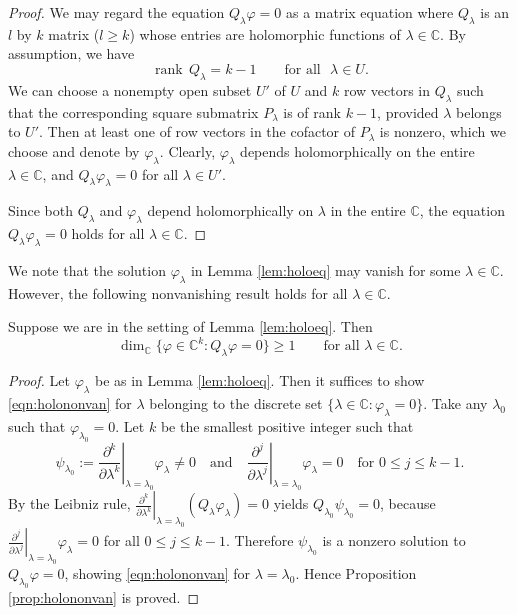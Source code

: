 \begin{proof}
We may regard the equation $Q_{\lambda} \varphi =0$
 as a matrix equation 
 where $Q_{\lambda}$ is an $l$ by $k$ matrix
 ($l \ge k$) 
 whose entries are holomorphic functions of $\lambda \in {\mathbb{C}}$.  
By assumption,
 we have
\[
 {\operatorname{rank}} \, Q_{\lambda}=k-1
\qquad
 \text{for all }\,\, \lambda \in U.  
\]
We can choose a nonempty open subset $U'$ of $U$
 and $k$ row vectors in $Q_{\lambda}$
 such that the corresponding square submatrix $P_{\lambda}$
 is of rank $k-1$, 
 provided $\lambda$ belongs to $U'$.  
Then at least one of row vectors
 in the cofactor of $P_{\lambda}$ is nonzero, 
 which we choose and denote by $\varphi_{\lambda}$.  
Clearly, 
 $\varphi_{\lambda}$ depends holomorphically
 on the entire ${\lambda}\in {\mathbb{C}}$, 
 and $Q_{\lambda} \varphi_{\lambda}=0$
 for all $\lambda \in U'$.  



Since both $Q_{\lambda}$ and $\varphi_{\lambda}$ depend holomorphically
 on $\lambda$
 in the entire ${\mathbb{C}}$, 
 the equation $Q_{\lambda}\varphi_{\lambda}=0$ holds
 for all $\lambda \in {\mathbb{C}}$.  
\end{proof}



We note that the solution $\varphi_{\lambda}$
 in Lemma \ref{lem:holoeq} may vanish 
 for some $\lambda \in {\mathbb{C}}$.  
However,
 the following nonvanishing result holds for all $\lambda \in {\mathbb{C}}$.  
\begin{proposition}
\label{prop:holononvan}
Suppose we are in the setting of Lemma \ref{lem:holoeq}.  
Then 
\begin{equation}
\label{eqn:holononvan}
\dim_{\mathbb{C}}
\{\varphi\in {\mathbb{C}}^k:Q_{\lambda}\varphi=0\} \ge 1
\qquad
\text{for all $\lambda \in {\mathbb{C}}$.}
\end{equation}
\end{proposition}
\begin{proof}
Let $\varphi_{\lambda}$ be as in Lemma \ref{lem:holoeq}.  
Then it suffices to show
 \eqref{eqn:holononvan} for $\lambda$
 belonging to the discrete set $\{\lambda \in {\mathbb{C}}:\varphi_{\lambda}=0\}$.  
Take any $\lambda_0$ such that
 $\varphi_{\lambda_0}=0$.  
Let $k$ be the smallest positive integer 
 such that 
\[
 \psi_{\lambda_0}
 :=\left.\frac{\partial^k}{\partial\lambda^k}\right|_{\lambda=\lambda_0}\varphi_{\lambda} \ne 0
\quad
\text{and}
\quad
 \left.\frac{\partial^{j}}{\partial\lambda^{j}}\right|_{\lambda=\lambda_0}\varphi_{\lambda} = 0
\quad
\text{for $0 \le j \le k-1$}.  
\]
By the Leibniz rule,
 $\left.\frac{\partial^k}{\partial\lambda^k}\right|_{\lambda=\lambda_0}
  (Q_{\lambda} \varphi_{\lambda}) = 0
$
 yields $Q_{\lambda_0} \psi_{\lambda_0}=0$, 
 because $\left. \frac{\partial^{j}}{\partial\lambda^{j}}\right|_{\lambda=\lambda_0}
               \varphi_{\lambda} = 0$
 for all $0 \le j \le k-1$.  
Therefore $\psi_{\lambda_0}$
 is a nonzero solution to $Q_{\lambda_0} \varphi=0$, 
showing \eqref{eqn:holononvan}
 for ${\lambda}=\lambda_0$.  
Hence Proposition \ref{prop:holononvan} is proved.  
\end{proof}

